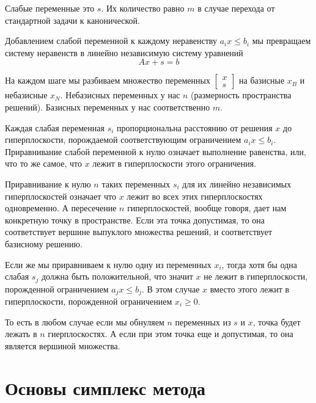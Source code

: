 \documentclass[a4paper,article,14pt]{extarticle}
\begin{document}
Слабые переменные это \(s\).
Их количество равно \(m\) в случае перехода от стандартной задачи к канонической.

Добавлением слабой переменной к каждому неравенству \(a_ix \le b_i\) мы превращаем систему неравенств в линейно независимую систему уравнений
\begin{equation}
    Ax + s = b
\end{equation}

На каждом шаге мы разбиваем множество переменных
\(\begin{bmatrix}
    x \\ s
\end{bmatrix}\)
на базисные \(x_B\) и небазисные \(x_N\).
Небазисных переменных у нас \(n\) (размерность пространства решений).
Базисных переменных у нас соответственно \(m\).

Каждая слабая переменная \(s_i\) пропорциональна расстоянию от решения \(x\) до гиперплоскости, порождаемой соответствующим ограничением \(a_ix \le b_i\).
Приравнивание слабой переменной к нулю означает выполнение равенства, или, что то же самое, что \(x\) лежит в гиперплоскости этого ограничения.

Приравнивание к нулю \(n\) таких переменных \(s_i\) для их линейно независимых гиперплоскостей означает что \(x\) лежит во всех этих гиперплоскостях одновременно.
А пересечение \(n\) гиперплоскостей, вообще говоря, дает нам конкретную точку в пространстве.
Если эта точка допустимая, то она соответствует вершине выпуклого множества решений, и соответствует базисному решению.

Если же мы приравниваем к нулю одну из переменных \(x_i\), тогда хотя бы одна слабая \(s_j\) должна быть положительной, что значит \(x\) не лежит в гиперплоскости, порожденной ограничением \(a_jx \le b_j\).
В этом случае \(x\) вместо этого лежит в гиперплоскости, порожденной ограничением \(x_i \ge 0\).

То есть в любом случае если мы обнуляем \(n\) переменных из \(s\) и \(x\), точка будет лежать в \(n\) гиерплоскостях. А если при этом точка еще и допустимая, то она является вершиной множества.

\newpage

\section{Основы симплекс метода}
\end{document}
